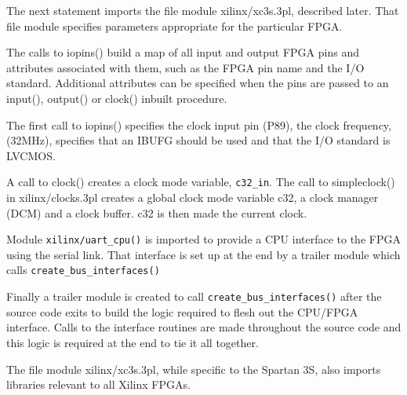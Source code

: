     The next statement imports the file module xilinx/xc3s.3pl, described later.
    That file module specifies parameters appropriate for the particular FPGA.
    
    The calls to iopins() build a map of all input and output FPGA pins and
    attributes associated with them, such as the FPGA pin name and the I/O
    standard. Additional attributes can be specified when the pins are
    passed to an input(), output() or clock() inbuilt procedure.
    
    The first call to iopins() specifies the clock input pin (P89), the clock
    frequency, (32MHz), specifies that an IBUFG should be used and that the I/O
    standard is LVCMOS.
    
    A call to clock() creates a clock mode variable, \verb'c32_in'. The call to
    simpleclock() in xilinx/clocks.3pl creates a global clock mode variable c32,
    a clock manager (DCM) and a clock buffer. c32 is then made the current clock.
    
    Module \verb'xilinx/uart_cpu()' is imported to provide a CPU interface
    to the FPGA using the serial link. That interface is set up at the end
    by a trailer module which calls \verb'create_bus_interfaces()'
    
    Finally a trailer module is created to call \verb'create_bus_interfaces()'
    after the source code exits to build the logic required to flesh out
    the CPU/FPGA interface. Calls to the interface routines are made throughout
    the source code and this logic is required at the end to tie it all
    together.
    
    
    
    
    
    
    
    
    The file module xilinx/xc3s.3pl, while specific to the Spartan 3S, also
    imports libraries relevant to all Xilinx FPGAs.
    
